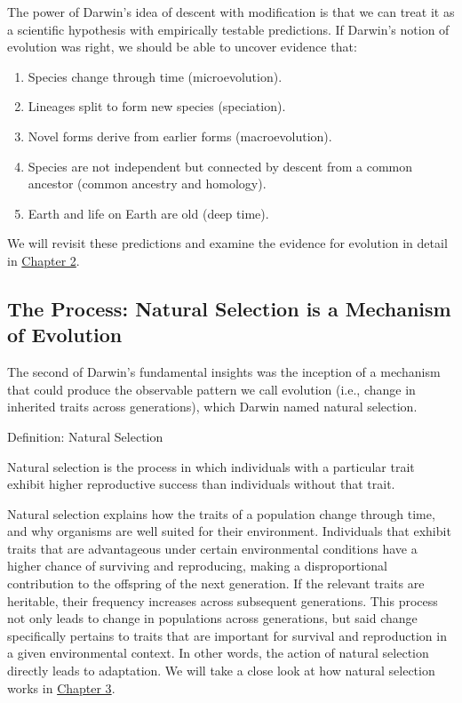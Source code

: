 \documentclass[
]{book}
\providecommand{\tightlist}{%
  \setlength{\itemsep}{0pt}\setlength{\parskip}{0pt}}
\begin{document}
The power of Darwin's idea of descent with modification is that we can treat it as a scientific hypothesis with empirically testable predictions. If Darwin's notion of evolution was right, we should be able to uncover evidence that:

\begin{enumerate}
\def\labelenumi{\arabic{enumi}.}
\tightlist
\item
  Species change through time (microevolution).
\item
  Lineages split to form new species (speciation).
\item
  Novel forms derive from earlier forms (macroevolution).
\item
  Species are not independent but connected by descent from a common ancestor (common ancestry and homology).
\item
  Earth and life on Earth are old (deep time).
\end{enumerate}

We will revisit these predictions and examine the evidence for evolution in detail in \href{evidence-for-evolution.html}{Chapter 2}.

\hypertarget{the-process-natural-selection-is-a-mechanism-of-evolution}{%
\subsection{The Process: Natural Selection is a Mechanism of Evolution}\label{the-process-natural-selection-is-a-mechanism-of-evolution}}

The second of Darwin's fundamental insights was the inception of a mechanism that could produce the observable pattern we call evolution (i.e., change in inherited traits across generations), which Darwin named natural selection.

Definition: Natural Selection

Natural selection is the process in which individuals with a particular trait exhibit higher reproductive success than individuals without that trait.

Natural selection explains how the traits of a population change through time, and why organisms are well suited for their environment. Individuals that exhibit traits that are advantageous under certain environmental conditions have a higher chance of surviving and reproducing, making a disproportional contribution to the offspring of the next generation. If the relevant traits are heritable, their frequency increases across subsequent generations. This process not only leads to change in populations across generations, but said change specifically pertains to traits that are important for survival and reproduction in a given environmental context. In other words, the action of natural selection directly leads to adaptation. We will take a close look at how natural selection works in \href{natural-selection-a-mechanism-for-change.html}{Chapter 3}.
\end{document}
